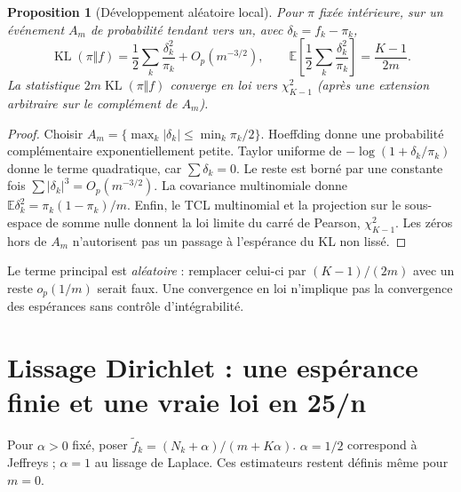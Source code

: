 \documentclass[11pt,a4paper]{article}
\newtheorem{proposition}{Proposition}
\theoremstyle{remark}\newtheorem*{remarque}{Remarque}
\newcommand{\E}{\mathbb E}
\newcommand{\KL}{\operatorname{KL}}
\newcommand{\1}{\mathbf 1}
\begin{document}
\begin{proposition}[Développement aléatoire local]
Pour $\pi$ fixée intérieure, sur un événement $A_m$ de probabilité tendant
vers un, avec $\delta_k=f_k-\pi_k$,
\[
 \KL(\pi\Vert f)=\frac12\sum_k\frac{\delta_k^2}{\pi_k}
                  +O_p(m^{-3/2}),\qquad
 \E\left[\frac12\sum_k\frac{\delta_k^2}{\pi_k}\right]=\frac{K-1}{2m}.
\]
La statistique $2m\KL(\pi\Vert f)$ converge en loi vers $\chi^2_{K-1}$
(après une extension arbitraire sur le complément de $A_m$).
\end{proposition}
\begin{proof}
Choisir $A_m=\{\max_k|\delta_k|\le\min_k\pi_k/2\}$.
Hoeffding donne une probabilité complémentaire exponentiellement petite.
Taylor uniforme de $-\log(1+\delta_k/\pi_k)$ donne le terme quadratique,
car $\sum\delta_k=0$. Le reste est borné par une constante fois
$\sum|\delta_k|^3=O_p(m^{-3/2})$. La covariance multinomiale donne
$\E\delta_k^2=\pi_k(1-\pi_k)/m$. Enfin, le TCL multinomial et la projection
sur le sous-espace de somme nulle donnent la loi limite du carré de Pearson,
$\chi^2_{K-1}$. Les zéros hors de $A_m$ n'autorisent pas un passage à
l'espérance du KL non lissé.
\end{proof}
Le terme principal est \emph{aléatoire} : remplacer celui-ci par $(K-1)/(2m)$
avec un reste $o_p(1/m)$ serait faux. Une convergence en loi n'implique pas
la convergence des espérances sans contrôle d'intégrabilité.

\section{Lissage Dirichlet : une espérance finie et une vraie loi en 25/n}
Pour $\alpha>0$ fixé, poser
$\widetilde f_k=(N_k+\alpha)/(m+K\alpha)$.
$\alpha=1/2$ correspond à Jeffreys ; $\alpha=1$ au lissage de Laplace.
Ces estimateurs restent définis même pour $m=0$.
\end{document}

